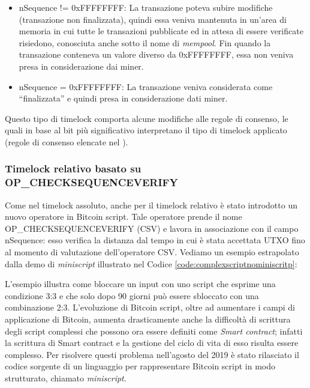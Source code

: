 \begin{itemize}
  \item nSequence != 0xFFFFFFFF: La transazione poteva subire modifiche (transazione non finalizzata), quindi essa veniva mantenuta in un'area di memoria in cui tutte le transazioni pubblicate ed in attesa di essere verificate risiedono, conosciuta anche sotto il nome di {\it mempool\/}. Fin quando la transazione conteneva un valore diverso da 0xFFFFFFFF, essa non veniva presa in considerazione dai miner.
  \item nSequence = 0xFFFFFFFF: La transazione veniva considerata come “finalizzata” e quindi presa in considerazione dati miner.
\end{itemize}

Questo tipo di timelock comporta alcune modifiche alle regole di consenso, le quali in base al bit più significativo interpretano il tipo di timelock applicato (regole di consenso elencate nel \cite{bitcoinbip:bip68}).

\subsubsection{Timelock relativo basato su OP\_CHECKSEQUENCEVERIFY}

Come nel timelock assoluto, anche per il timelock relativo è stato introdotto un nuovo operatore in Bitcoin script.  Tale operatore prende il nome
OP\_CHECK\-SEQUENCE\-VERIFY (CSV) e lavora in associazione con il campo nSequence: esso verifica la distanza dal tempo in cui è stata accettata UTXO  fino al momento di valutazione dell'operatore CSV. Vediamo un esempio estrapolato dalla demo di {\it miniscript \/} illustrato nel Codice \ref{code:complexscriptnominiscritp}:



L’esempio illustra come bloccare un input con uno script che esprime una condizione 3:3 e che solo dopo 90 giorni può essere sbloccato con una combinazione 2:3.
L’evoluzione di Bitcoin script, oltre ad aumentare i campi di applicazione di Bitcoin, aumenta drasticamente anche la difficoltà di scrittura degli script complessi che possono ora essere definiti come {\it Smart contract\/}; infatti la scrittura di Smart contract e la gestione del ciclo di vita di esso risulta essere complesso.
Per risolvere questi problema nell'agosto del 2019 è stato rilasciato il codice sorgente di un linguaggio per rappresentare Bitcoin script in modo strutturato, chiamato \emph{miniscript}.

